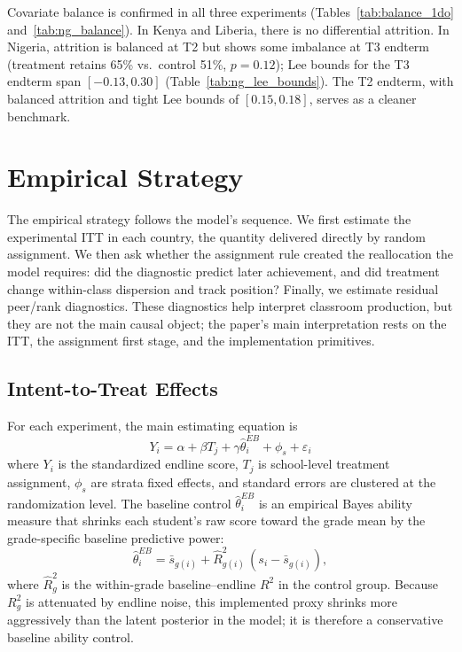 \documentclass[11pt]{article}
\begin{document}
Covariate balance is confirmed in all three experiments (Tables~\ref{tab:balance_1do} and~\ref{tab:ng_balance}). In Kenya and Liberia, there is no differential attrition. In Nigeria, attrition is balanced at T2 but shows some imbalance at T3 endterm (treatment retains 65\% vs.\ control 51\%, $p = 0.12$); Lee bounds for the T3 endterm span $[-0.13, 0.30]$ (Table~\ref{tab:ng_lee_bounds}). The T2 endterm, with balanced attrition and tight Lee bounds of $[0.15, 0.18]$, serves as a cleaner benchmark.


\section{Empirical Strategy}
\label{sec:strategy}

The empirical strategy follows the model's sequence. We first estimate the experimental ITT in each country, the quantity delivered directly by random assignment. We then ask whether the assignment rule created the reallocation the model requires: did the diagnostic predict later achievement, and did treatment change within-class dispersion and track position? Finally, we estimate residual peer/rank diagnostics. These diagnostics help interpret classroom production, but they are not the main causal object; the paper's main interpretation rests on the ITT, the assignment first stage, and the implementation primitives.

\subsection{Intent-to-Treat Effects}

For each experiment, the main estimating equation is
\begin{equation}
\label{eq:itt}
Y_i = \alpha + \beta T_j + \gamma \hat{\theta}^{EB}_i + \phi_s + \varepsilon_i
\end{equation}
where $Y_i$ is the standardized endline score, $T_j$ is school-level treatment assignment, $\phi_s$ are strata fixed effects, and standard errors are clustered at the randomization level. The baseline control $\hat{\theta}^{EB}_i$ is an empirical Bayes ability measure that shrinks each student's raw score toward the grade mean by the grade-specific baseline predictive power:
\begin{equation}
\label{eq:eb}
\hat{\theta}^{EB}_{i} = \bar{s}_{g(i)} + \widehat{R}^2_{g(i)}\,(s_i - \bar{s}_{g(i)}),
\end{equation}
where $\widehat{R}^2_g$ is the within-grade baseline--endline $R^2$ in the control group. Because $R^2_g$ is attenuated by endline noise, this implemented proxy shrinks more aggressively than the latent posterior in the model; it is therefore a conservative baseline ability control.
\end{document}
